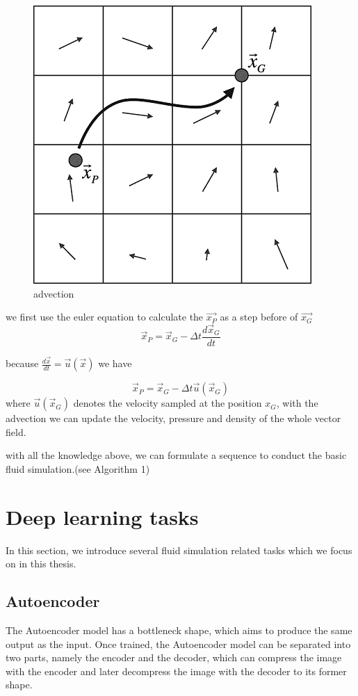 \documentclass[a4paper,12pt,twoside]{report}
\begin{document}
\begin{figure}[h]
\centering
\includegraphics[scale=0.5]{advection.png}
\caption{advection\cite{semi}}
\end{figure}

we first use the euler equation to calculate the $\vec{x_P}$ as a step before of $\vec{x_G}$
\begin{equation}
\vec x_P=\vec x_G-\Delta t\frac{d\vec x_G}{dt}
\end{equation}

because $\frac{d\vec x}{dt}=\vec u(\vec x)$ we have

\begin{equation}
\vec x_P=\vec x_G-\Delta t\vec u(\vec x_G)
\end{equation}
where $\vec u(\vec x_G)$ denotes the velocity sampled at the position $x_G$, with the advection we can update the velocity, pressure and density of the whole vector field.

with all the knowledge above, we can formulate a sequence to conduct the basic fluid simulation.(see Algorithm 1)


\section{Deep learning tasks}
In this section, we introduce several fluid simulation related tasks which we focus on in this thesis.
\subsection{Autoencoder}
The Autoencoder model has a bottleneck shape, which aims to produce the same output as the input. Once trained, the Autoencoder model can be separated into two parts, namely the encoder and the decoder, which can compress the image with the encoder and later decompress the image with the decoder to its former shape.
\end{document}
